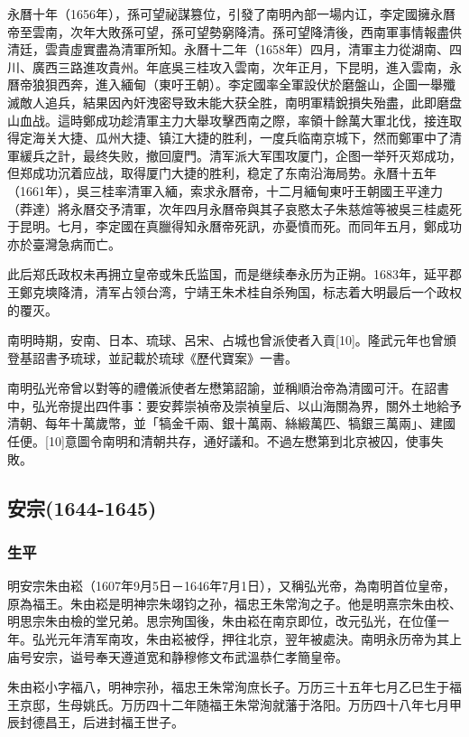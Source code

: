 永曆十年（1656年），孫可望祕謀篡位，引發了南明內部一場内讧，李定國擁永曆帝至雲南，次年大敗孫可望，孫可望勢窮降清。孫可望降清後，西南軍事情報盡供清廷，雲貴虛實盡為清軍所知。永曆十二年（1658年）四月，清軍主力從湖南、四川、廣西三路進攻貴州。年底吳三桂攻入雲南，次年正月，下昆明，進入雲南，永曆帝狼狽西奔，進入緬甸（東吁王朝）。李定國率全軍設伏於磨盤山，企圖一舉殲滅敵人追兵，結果因內奸洩密导致未能大获全胜，南明軍精銳損失殆盡，此即磨盘山血战。這時鄭成功趁清軍主力大舉攻擊西南之際，率領十餘萬大軍北伐，接连取得定海关大捷、瓜州大捷、镇江大捷的胜利，一度兵临南京城下，然而鄭軍中了清軍緩兵之計，最终失败，撤回廈門。清军派大军围攻厦门，企图一举歼灭郑成功，但郑成功沉着应战，取得厦门大捷的胜利，稳定了东南沿海局势。永曆十五年（1661年），吳三桂率清軍入緬，索求永曆帝，十二月緬甸東吁王朝國王平達力（莽達）將永曆交予清軍，次年四月永曆帝與其子哀愍太子朱慈煊等被吳三桂處死于昆明。七月，李定國在真臘得知永曆帝死訊，亦憂憤而死。而同年五月，鄭成功亦於臺灣急病而亡。

此后郑氏政权未再拥立皇帝或朱氏监国，而是继续奉永历为正朔。1683年，延平郡王鄭克塽降清，清军占领台湾，宁靖王朱术桂自杀殉国，标志着大明最后一个政权的覆灭。

南明時期，安南、日本、琉球、呂宋、占城也曾派使者入貢[10]。隆武元年也曾頒登基詔書予琉球，並記載於琉球《歷代寶案》一書。

南明弘光帝曾以對等的禮儀派使者左懋第詔諭，並稱順治帝為清國可汗。在詔書中，弘光帝提出四件事：要安葬崇禎帝及崇禎皇后、以山海關為界，關外土地給予清朝、每年十萬歲幣，並「犒金千兩、銀十萬兩、絲緞萬匹、犒銀三萬兩」、建國任便。[10]意圖令南明和清朝共存，通好議和。不過左懋第到北京被囚，使事失敗。

\subsection{安宗\tiny(1644-1645)}

\subsubsection{生平}

明安宗朱由崧（1607年9月5日－1646年7月1日），又稱弘光帝，為南明首位皇帝，原為福王。朱由崧是明神宗朱翊钧之孙，福忠王朱常洵之子。他是明熹宗朱由校、明思宗朱由檢的堂兄弟。思宗殉国後，朱由崧在南京即位，改元弘光，在位僅一年。弘光元年清军南攻，朱由崧被俘，押往北京，翌年被處決。南明永历帝为其上庙号安宗，谥号奉天遵道宽和静穆修文布武溫恭仁孝簡皇帝。

朱由崧小字福八，明神宗孙，福忠王朱常洵庶长子。万历三十五年七月乙巳生于福王京邸，生母姚氏。万历四十二年随福王朱常洵就藩于洛阳。万历四十八年七月甲辰封德昌王，后进封福王世子。

